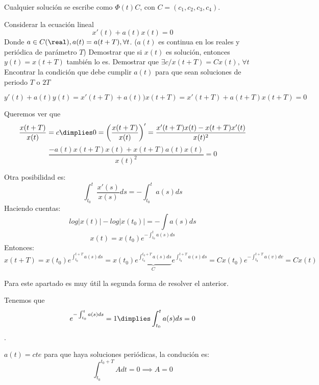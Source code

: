\documentclass[nochap]{apuntes}
\begin{document}
Cualquier solución se escribe como $\Phi(t)C$, con $C = (c_1,c_2,c_3,c_4)$.

\begin{problem}[1]
Considerar la ecuación lineal
\[x'(t) + a(t)x(t) = 0\]
Donde $a\in C(\real), a(t) = a(t+T), \forall t$. ($a(t)$ es continua en los reales y periódica de parámetro $T$)
\ppart Demostrar que si $x(t)$ es solución, entonces $y(t) = x(t + T)$ también lo es.
\ppart Demostrar que  $\exists c / x(t+T) = Cx(t),\,\forall t$
\ppart Encontrar la condición que debe cumplir $a(t)$ para que sean soluciones de periodo $T$ o $2T$

\solution

\spart $y'(t) + a(t)y(t) = x'(t+T) + a(t)) x(t+T) = x'(t+T) + a(t+T)x(t+T) = 0$

\spart Queremos ver que \[\displaystyle \frac{x(t+T)}{x(t)} = c \dimplies 0=\left(\frac{x(t+T)}{x(t)}\right)' = \frac{x'(t+T)x(t) - x(t+T)x'(t)}{x(t)^2}\]
\[\frac{-a(t)x(t+T)x(t) + x(t+T)a(t)x(t)}{x(t)^2} = 0\]

Otra posibilidad es:
\[\int_{t_0}^{t} \frac{x'(s)}{x(s)}ds = -\int_{t_0}^{t}a(s)ds\]
Haciendo cuentas:
\[log|x(t)| - log|x(t_0)| = -\int a(s)ds\]
\[x(t) = x(t_0)e^{-\int_{t_0}^t a(s)ds}\]
Entonces:
\[x(t+T) = x(t_0)e^{\int_{t_0}^{t+T} a(s)ds} = x(t_0)\underbrace{e^{\int_{t_0}^{t_0+T} a(s)ds}}_{C}e^{\int_{t_0}^{t+T} a(s)ds} = Cx(t_0)e^{-\int_{t_0}^{t+T} a(v)dv} = Cx(t)\]

\spart Para este apartado es muy útil la segunda forma de resolver el anterior.

Tenemos que \[e^{-\int_{t_0}^t a(s)ds} = 1 \dimplies \int_{t_0}^t a(s)ds=0\].

\spart $a(t)=cte$ para que haya soluciones periódicas, la condución es:
\[\int_{t_0}^{t_0+T} Adt=0\implies A=0\]

\end{problem}
\end{document}

